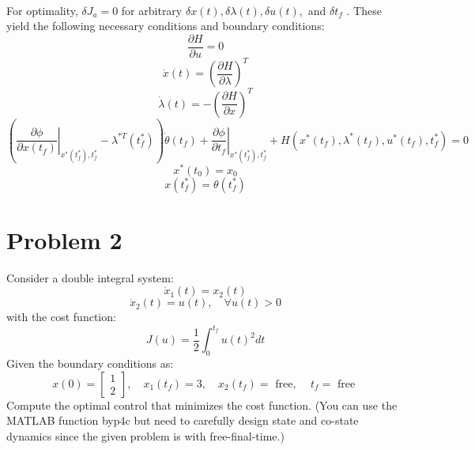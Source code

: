 \documentclass[10pt,a4paper,oneside]{article}
\begin{document}
\begin{enumerate}
\begin{align*}
\end{align*}
For optimality, $\delta J_{a}=0$ for arbitrary $\delta x(t), \delta \lambda(t), \delta u(t),$ and $\delta t_{f}$ . These yield the following necessary conditions and boundary conditions:
\[
\frac{\partial H}{\partial u}=0
\]
\[
\dot{x}(t)=\left(\frac{\partial H}{\partial \lambda}\right)^{T}
\]
\[
\dot{\lambda}(t)=-\left(\frac{\partial H}{\partial x}\right)^{T}
\]
\[
\left(\left.\frac{\partial \phi}{\partial x\left(t_{f}\right)}\right|_{x^{*}\left(t_{f}^*\right), t_{f}^{*}}-\lambda^{* T}\left(t_{f}^{*}\right)\right) \dot{\theta}\left(t_{f}\right)
+\left.\frac{\partial \phi}{\partial t_{f}}\right|_{x^{*}\left(t_{f}^{*}\right), t_{f}^*}+H\left(x^{*}\left(t_{f}\right), \lambda^{*}\left(t_{f}\right), u^{*}\left(t_{f}\right), t_{f}^{*}\right)=0
\]
\[
x^{*}\left(t_{0}\right)=x_{0}
\]
\[
x\left(t_{f}^{*}\right)=\theta\left(t_{f}^{*}\right)
\]
\end{enumerate}
 \section* {Problem 2} 
Consider a double integral system:
\[
\dot{x}_{1}(t)=x_{2}(t)
\]
\[
\dot{x}_{2}(t)=u(t), \quad \forall u(t)>0
\]
with the cost function:
\[
J(u)=\frac{1}{2} \int_{0}^{t_{f}} u(t)^{2} d t
\]
Given the boundary conditions as:
\[
x(0)=\left[\begin{array}{l}{1} \\ {2}\end{array}\right], \quad x_{1}\left(t_{f}\right)=3, \quad x_{2}\left(t_{f}\right)=\text { free, } \quad t_{f}=\text { free }
\]
Compute the optimal control that minimizes the cost function. (You can use the MATLAB function
byp4c but need to carefully design state and co-state dynamics since the given problem is with
free-final-time.)
\end{document}
